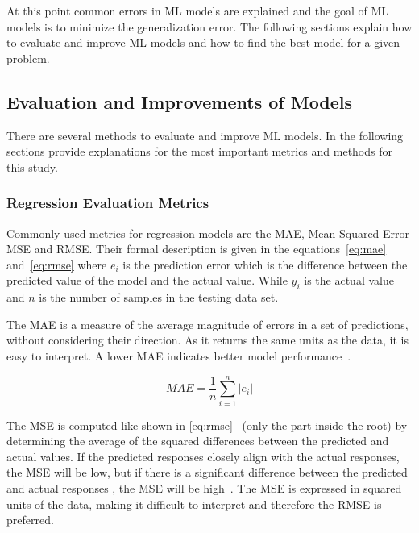 At this point common errors in ML models are explained and the goal of ML models is to minimize the generalization
error.
The following sections explain how to evaluate and improve ML models and how to find the best model for a given
problem.

\subsection{Evaluation and Improvements of Models}\label{subsec:evaluations-and-improvements-of-models}
There are several methods to evaluate and improve ML models.
In the following sections provide explanations for the most important metrics and methods for this study.

\subsubsection{Regression Evaluation Metrics}\label{subsubsec:regression-metrics}
Commonly used metrics for regression models are the \ac{MAE}, Mean Squared Error \ac{MSE} and \ac{RMSE}.
Their formal description is given in the equations~\ref{eq:mae} and~\ref{eq:rmse} where
$e_i$ is the prediction error which is the difference between the predicted value of the model and the actual value.
While $y_i$ is the actual value and $n$ is the number of samples in the testing data set.

The MAE is a measure of the average magnitude of errors in a set of predictions, without considering their direction.
As it returns the same units as the data, it is easy to interpret.
A lower MAE indicates better model performance~\cite[pp. 1248]{chai2014root}.

\begin{tcolorbox}[arc=0pt,boxrule=0.5pt]
    \begin{equation}
        MAE = \frac{1}{n} \sum_{i=1}^{n} |e_i|
        \label{eq:mae}
    \end{equation}
\end{tcolorbox}

The MSE is computed like shown in \cref{eq:rmse}~\cite[p. 1248]{chai2014root} (only the part inside the root) by
determining the average of the squared differences between the predicted and actual values.
If the predicted responses closely align with the actual responses, the MSE will be low, but if there is a significant
difference between the predicted and actual responses , the MSE will be high~\cite[p. 30]{hastie2009elements}.
The MSE is expressed in squared units of the data, making it difficult to interpret and therefore the RMSE is preferred.

